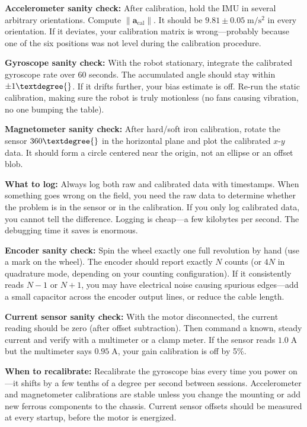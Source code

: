 \textbf{Accelerometer sanity check:} After calibration, hold the IMU in several arbitrary orientations. Compute $\|\mathbf{a}_{\text{cal}}\|$. It should be $9.81 \pm 0.05\;\mathrm{m/s^2}$ in every orientation. If it deviates, your calibration matrix is wrong---probably because one of the six positions was not level during the calibration procedure.

\textbf{Gyroscope sanity check:} With the robot stationary, integrate the calibrated gyroscope rate over 60 seconds. The accumulated angle should stay within $\pm 1\textdegree{}$. If it drifts further, your bias estimate is off. Re-run the static calibration, making sure the robot is truly motionless (no fans causing vibration, no one bumping the table).

\textbf{Magnetometer sanity check:} After hard/soft iron calibration, rotate the sensor $360\textdegree{}$ in the horizontal plane and plot the calibrated $x$-$y$ data. It should form a circle centered near the origin, not an ellipse or an offset blob.

\textbf{What to log:} Always log both raw and calibrated data with timestamps. When something goes wrong on the field, you need the raw data to determine whether the problem is in the sensor or in the calibration. If you only log calibrated data, you cannot tell the difference. Logging is cheap---a few kilobytes per second. The debugging time it saves is enormous.

\textbf{Encoder sanity check:} Spin the wheel exactly one full revolution by hand (use a mark on the wheel). The encoder should report exactly $N$ counts (or $4N$ in quadrature mode, depending on your counting configuration). If it consistently reads $N-1$ or $N+1$, you may have electrical noise causing spurious edges---add a small capacitor across the encoder output lines, or reduce the cable length.

\textbf{Current sensor sanity check:} With the motor disconnected, the current reading should be zero (after offset subtraction). Then command a known, steady current and verify with a multimeter or a clamp meter. If the sensor reads $1.0\;\mathrm{A}$ but the multimeter says $0.95\;\mathrm{A}$, your gain calibration is off by 5\%.

\textbf{When to recalibrate:} Recalibrate the gyroscope bias every time you power on---it shifts by a few tenths of a degree per second between sessions. Accelerometer and magnetometer calibrations are stable unless you change the mounting or add new ferrous components to the chassis. Current sensor offsets should be measured at every startup, before the motor is energized.

